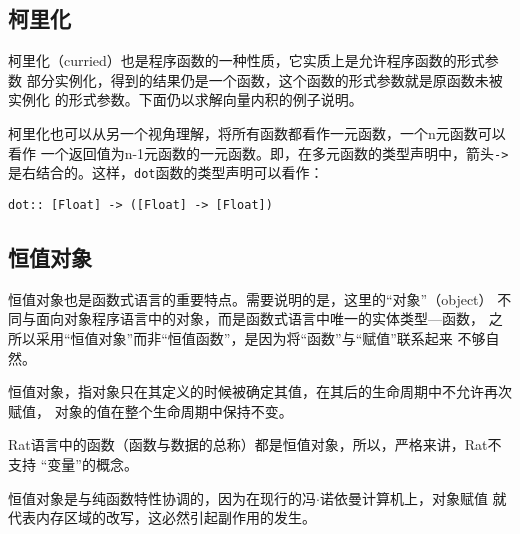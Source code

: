 \subsection{柯里化}
柯里化（curried）也是程序函数的一种性质，它实质上是允许程序函数的形式参数
部分实例化，得到的结果仍是一个函数，这个函数的形式参数就是原函数未被实例化
的形式参数。下面仍以求解向量内积的例子说明。
\begin{quotation}
\end{quotation}

柯里化也可以从另一个视角理解，将所有函数都看作一元函数，一个n元函数可以看作
一个返回值为n-1元函数的一元函数。即，在多元函数的类型声明中，箭头\texttt{->}
是右结合的。这样，\texttt{dot}函数的类型声明可以看作：\\
\centerline{\texttt{dot:: [Float] -> ([Float] -> [Float])}}

\subsection{恒值对象}\label{subsec:immutable-object}
恒值对象也是函数式语言的重要特点。需要说明的是，这里的“对象”（object）
不同与面向对象程序语言中的对象，而是函数式语言中唯一的实体类型---函数，
之所以采用“恒值对象”而非“恒值函数”，是因为将“函数”与“赋值”联系起来
不够自然。
\begin{definition}
  恒值对象，指对象只在其定义的时候被确定其值，在其后的生命周期中不允许再次赋值，
  对象的值在整个生命周期中保持不变。
\end{definition}

Rat语言中的函数（函数与数据的总称）都是恒值对象，所以，严格来讲，Rat不支持
“变量”的概念。

恒值对象是与纯函数特性协调的，因为在现行的冯$\cdot$诺依曼计算机上，对象赋值
就代表内存区域的改写，这必然引起副作用的发生。

